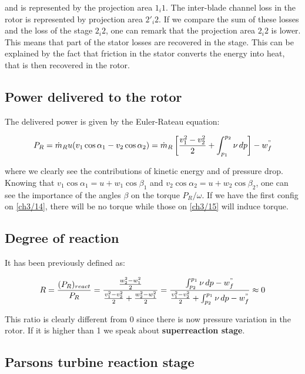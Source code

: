 and is represented by the projection area $1_i1$. The inter-blade channel loss in the rotor is represented by projection area $2'_i 2$. If we compare the sum of these losses and the loss of the stage $2_i2$, one can remark that the projection area $2_i2$ is lower. This means that part of the stator losses are recovered in the stage. This can be explained by the fact that friction in the stator converts the energy into heat, that is then recovered in the rotor. 

\subsection{Power delivered to the rotor}
The delivered power is given by the Euler-Rateau equation: 

\begin{equation}
P_R = \dot{m}_R u (v_1 \cos \alpha _1 - v_2 \cos \alpha _2) = \dot{m}_R \left[ \frac{v_1^2-v_2^2}{2}+ \int _{p_1}^{p_2} \nu\, dp \right] - w^"_f
\end{equation} 

where we clearly see the contributions of kinetic energy and of pressure drop. Knowing that $v_1 \cos \alpha _1 = u + w_1 \cos \beta _1$ and $v_2 \cos \alpha _2 = u + w_2 \cos \beta _2$, one can see the importance of the angles $\beta$ on the torque $P_R/ \omega$. If we have the first config on \autoref{ch3/14}, there will be no torque while those on \autoref{ch3/15} will induce torque. 

\subsection{Degree of reaction}
It has been previously defined as: 

\begin{equation}
R= \frac{(P_R)_{react}}{P_R} = \frac{\frac{w_2^2 - w_1^2}{2}}{\frac{v_1^2 - v_2^2}{2}+ \frac{w_2^2 - w_1^2}{2}} = \frac{\int _{p_2}^{p_1}\nu\, dp -w^"_f}{\frac{v_1^2 - v_2^2}{2}+ \int _{p_2}^{p_1}\nu\, dp -w^"_f} \approx 0
\end{equation}

This ratio is clearly different from 0 since there is now pressure variation in the rotor. If it is higher than 1 we speak about \textbf{superreaction stage}.

\subsection{Parsons turbine reaction stage} 

